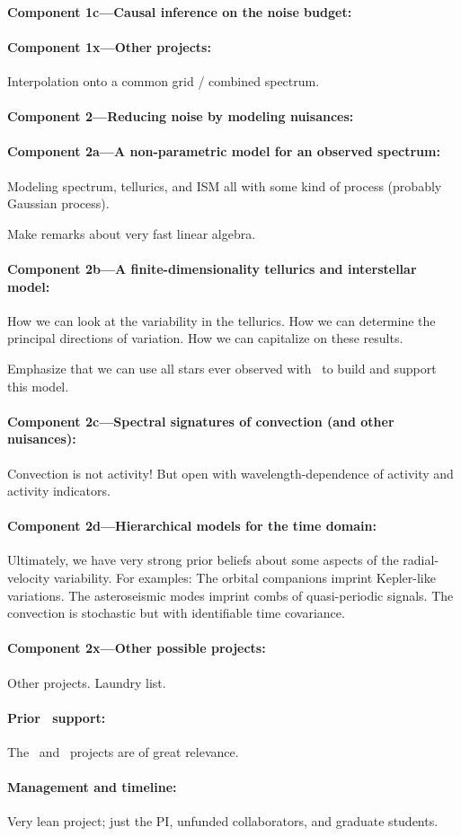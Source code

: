 \documentclass[12pt, fullpage, letterpaper]{article}
\begin{document}
\paragraph{Component 1c---Causal inference on the noise budget:}

\paragraph{Component 1x---Other projects:}
Interpolation onto a common grid / combined spectrum.

\paragraph{Component 2---Reducing noise by modeling nuisances:}

\paragraph{Component 2a---A non-parametric model for an observed spectrum:}
Modeling spectrum, tellurics, and ISM all with some kind of
process (probably Gaussian process).

Make remarks about very fast linear algebra.

\paragraph{Component 2b---A finite-dimensionality tellurics and interstellar model:}
How we can look at the variability in the tellurics.
How we can determine the principal directions of variation.
How we can capitalize on these results.

Emphasize that we can use all stars ever observed with \HARPS\ to
build and support this model.

\paragraph{Component 2c---Spectral signatures of convection (and other nuisances):}
Convection is not activity! But open with wavelength-dependence of
activity and activity indicators.

\paragraph{Component 2d---Hierarchical models for the time domain:}
Ultimately, we have very strong prior beliefs about some aspects
of the radial-velocity variability. For examples: The orbital
companions imprint Kepler-like variations. The asteroseismic modes
imprint combs of quasi-periodic signals. The convection is stochastic
but with identifiable time covariance.

\paragraph{Component 2x---Other possible projects:}
Other projects. Laundry list.

\paragraph{Prior \NASA\ support:}
The \GALEX\ and \Ktwo\ projects are of great relevance.

\paragraph{Management and timeline:}
Very lean project; just the PI, unfunded collaborators, and graduate students.
\end{document}
